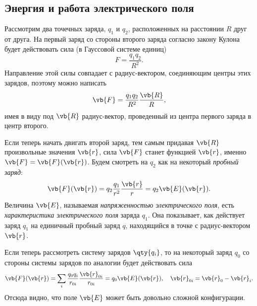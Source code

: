 \documentclass[\docroot/reports/lectures-draft/report.tex]{subfiles}
\begin{document}
\onlyinsubfile{\tableofcontents}

\subsection{Энергия и работа электрического поля}

    Рассмотрим два точечных заряда, $q_1$ и $q_2$, расположенных на расстоянии $R$ друг от друга. На первый заряд со стороны второго заряда согласно закону Кулона будет действовать сила (в Гауссовой системе единиц)
    \begin{equation*}
        F = \frac{q_1 q_2}{R^2} .
    \end{equation*}
    Направление этой силы совпадает с радиус-вектором, соединяющим центры этих зарядов, поэтому можно написать
    \begin{equation*}
        \vb{F} = \frac{q_1 q_2}{R^2} \frac{\vb{R}}{R} ,
    \end{equation*}
    имея в виду под $\vb{R}$ радиус-вектор, проведенный из центра первого заряда в центр второго.

    Если теперь начать двигать второй заряд, тем самым придавая $\vb{R}$ произвольные значения $\vb{r}$, сила $\vb{F}$ станет функцией $\vb{r}$, именно $\vb{F} = \vb{F}(\vb{r})$. Будем смотреть на $q_2$ как на некоторый \textit{пробный заряд}:
    \begin{equation*}
        \vb{F}(\vb{r}) = q_2 \frac{q_1}{r^2} \frac{\vb{r}}{r} = q_2 \vb{E}(\vb{r}) .
    \end{equation*}
    Величина $\vb{E}$, называемая \textit{напряженностью электрического поля}, есть \textit{характеристика электрического поля} заряда $q_1$. Она показывает, как действует заряд $q_1$ на единичный пробный заряд $q$, находящийся в точке с радиус-вектором $\vb{r}$.

    Если теперь рассмотреть систему зарядов $\qty{q_i}$, то на некоторый заряд $q_0$ со стороны системы зарядов по аналогии будет действовать сила
    \begin{equation*}
        \vb{F}(\vb{r}) = \sum\limits_i \frac{q_0 q_i}{r_{0i}} \frac{\vb{r}_{0i}}{r_{0i}} = q_0 \vb{E}(\vb{r}) , \quad \vb{r}_{0i} = \vb{r}_0 - \vb{r}_i .
    \end{equation*}
    Отсюда видно, что поле $\vb{E}$ может быть довольно сложной конфигурации.
\end{document}
